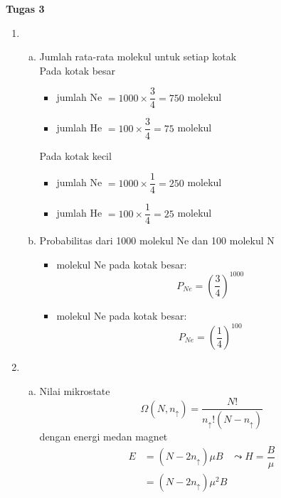 \textbf{Tugas 3}
\begin{enumerate}
    \item  
    \begin{enumerate}[(a)]
        \item Jumlah rata-rata molekul untuk setiap kotak\\
        Pada kotak besar
        \begin{itemize}
            \item jumlah Ne $=1000\times\dfrac{3}{4}=750$ molekul
            \item jumlah He $=100\times\dfrac{3}{4}=75$ molekul
        \end{itemize}
        Pada kotak kecil
        \begin{itemize}
            \item jumlah Ne $=1000\times\dfrac{1}{4}=250$ molekul
            \item jumlah He $=100\times\dfrac{1}{4}=25$ molekul
        \end{itemize}
        \item Probabilitas dari 1000 molekul Ne dan 100 molekul N
        \begin{itemize}
            \item molekul Ne pada kotak besar:
            \begin{equation*}
                P_{Ne}=\left(\dfrac{3}{4}\right)^{1000}
            \end{equation*}
            \item molekul Ne pada kotak besar:
            \begin{equation*}
                P_{Ne}=\left(\dfrac{1}{4}\right)^{100}
            \end{equation*}
        \end{itemize}
    \end{enumerate}
    \item 
    \begin{enumerate}[(a)]
        \item Nilai mikrostate
        \begin{equation*}
            \Omega(N,n_{\uparrow})=\dfrac{N!}{n_{\uparrow}!(N-n_{\uparrow})}
        \end{equation*}
        dengan energi medan magnet
        \begin{equation*}
            \begin{split}
                E&=(N-2n_{\uparrow})\mu B\;\;\;\leadsto H=\dfrac{B}{\mu}\\
                &=(N-2n_{\uparrow})\mu^2 B

\end{split}
\end{equation*}
\end{enumerate}
\end{enumerate}
